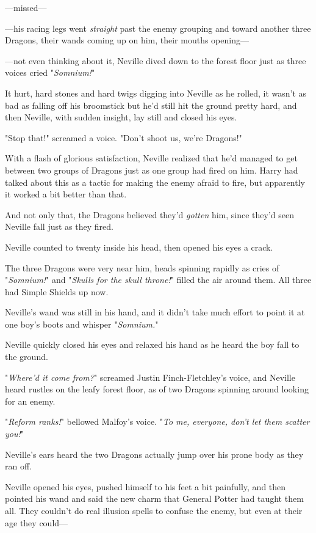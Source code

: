 ---missed---

---his racing legs went \emph{straight} past the enemy grouping and toward 
another three Dragons, their wands coming up on him, their mouths opening---

---not even thinking about it, Neville dived down to the forest floor just as 
three voices cried "\emph{Somnium!}"

It hurt, hard stones and hard twigs digging into Neville as he rolled, it 
wasn't as bad as falling off his broomstick but he'd still hit the ground 
pretty hard, and then Neville, with sudden insight, lay still and closed his 
eyes.

"Stop that!" screamed a voice. "Don't shoot us, we're Dragons!"

With a flash of glorious satisfaction, Neville realized that he'd managed to 
get between two groups of Dragons just as one group had fired on him. Harry had 
talked about this as a tactic for making the enemy afraid to fire, but 
apparently it worked a bit better than that.

And not only that, the Dragons believed they'd \emph{gotten} him, since they'd 
seen Neville fall just as they fired.

Neville counted to twenty inside his head, then opened his eyes a crack.

The three Dragons were very near him, heads spinning rapidly as cries of 
"\emph{Somnium!}" and "\emph{Skulls for the skull throne!}" filled the air 
around them. All three had Simple Shields up now.

Neville's wand was still in his hand, and it didn't take much effort to point 
it at one boy's boots and whisper "\emph{Somnium.}"

Neville quickly closed his eyes and relaxed his hand as he heard the boy fall 
to the ground.

"\emph{Where'd it come from?}" screamed Justin Finch-Fletchley's voice, and 
Neville heard rustles on the leafy forest floor, as of two Dragons spinning 
around looking for an enemy.

"\emph{Reform ranks!}" bellowed Malfoy's voice. "\emph{To me, everyone, don't 
let them scatter you!}"

Neville's ears heard the two Dragons actually jump over his prone body as they 
ran off.

Neville opened his eyes, pushed himself to his feet a bit painfully, and then 
pointed his wand and said the new charm that General Potter had taught them 
all. They couldn't do real illusion spells to confuse the enemy, but even at 
their age they could---

